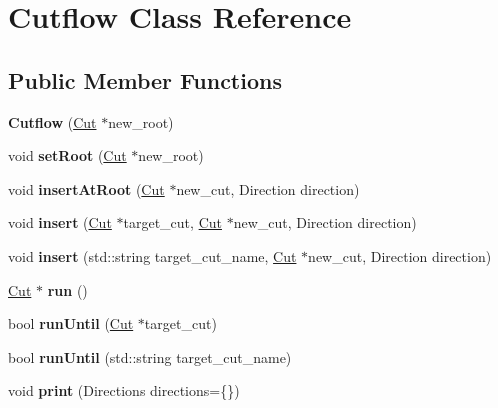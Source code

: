 \hypertarget{classCutflow}{}\section{Cutflow Class Reference}
\label{classCutflow}
\subsection*{Public Member Functions}
\begin{DoxyCompactItemize}
\item 
{\bfseries Cutflow} (\hyperlink{classCut}{Cut} $\ast$new\+\_\+root)\hypertarget{classCutflow_a943ac94db62104f63499c41b5aa83b4d}{}\label{classCutflow_a943ac94db62104f63499c41b5aa83b4d}

\item 
void {\bfseries set\+Root} (\hyperlink{classCut}{Cut} $\ast$new\+\_\+root)\hypertarget{classCutflow_ad27d37141c3748779a5d81fad919ecbb}{}\label{classCutflow_ad27d37141c3748779a5d81fad919ecbb}

\item 
void {\bfseries insert\+At\+Root} (\hyperlink{classCut}{Cut} $\ast$new\+\_\+cut, Direction direction)\hypertarget{classCutflow_a9cee412ae1a841068b0192120074b505}{}\label{classCutflow_a9cee412ae1a841068b0192120074b505}

\item 
void {\bfseries insert} (\hyperlink{classCut}{Cut} $\ast$target\+\_\+cut, \hyperlink{classCut}{Cut} $\ast$new\+\_\+cut, Direction direction)\hypertarget{classCutflow_a35cf443b602a92cab92012da3ab5a93b}{}\label{classCutflow_a35cf443b602a92cab92012da3ab5a93b}

\item 
void {\bfseries insert} (std\+::string target\+\_\+cut\+\_\+name, \hyperlink{classCut}{Cut} $\ast$new\+\_\+cut, Direction direction)\hypertarget{classCutflow_a8da46f1053a6b97991489ee0920c29a1}{}\label{classCutflow_a8da46f1053a6b97991489ee0920c29a1}

\item 
\hyperlink{classCut}{Cut} $\ast$ {\bfseries run} ()\hypertarget{classCutflow_ad18b65471b1e50457a6cb3653961ee3f}{}\label{classCutflow_ad18b65471b1e50457a6cb3653961ee3f}

\item 
bool {\bfseries run\+Until} (\hyperlink{classCut}{Cut} $\ast$target\+\_\+cut)\hypertarget{classCutflow_aaa3cecdf78988aacf6f7e89758addbbf}{}\label{classCutflow_aaa3cecdf78988aacf6f7e89758addbbf}

\item 
bool {\bfseries run\+Until} (std\+::string target\+\_\+cut\+\_\+name)\hypertarget{classCutflow_a3b5a6dc6e9490037d190eca691295859}{}\label{classCutflow_a3b5a6dc6e9490037d190eca691295859}

\item 
void {\bfseries print} (Directions directions=\{\})\hypertarget{classCutflow_a5d9f9fa315303fa9f63738dd41c05042}{}\label{classCutflow_a5d9f9fa315303fa9f63738dd41c05042}

\end{DoxyCompactItemize}
